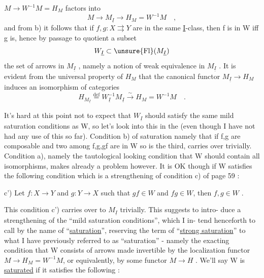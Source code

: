
$M\longrightarrow W^{-1}M=H_M$ factors into
\[ M\longrightarrow M_{\underline{I}}\longrightarrow H_M = W^{-1}M \quad , \]
and from b) it follows that if $f,g : X\rightrightarrows Y$ are in the same \underline{I}-class, then
f is in W iff g is, hence by passage to quotient a subset
\[ W_{\underline{I}}\subset \unsure{\mathrm{Fl}}(M_{\underline{I}}) \]
 the set of arrows in $M_{\underline{I}}$ , namely a notion of  weak equivalence in
$M_{\underline{I}}$ . It is evident from the universal property of $H_M$ that the canonical
functor $M_{\underline{I}}\to H_M$ induces an isomorphism of categories
\[ H_{M_{\underline{I}}} \overset{\mathrm{def}}{=} W_{\underline{I}}^{-1}M_{\underline{I}} \xrightarrow{\ \sim\ } H_M = W^{-1}M \quad . \]

\margin{\unsure{$\ulcorner$}}It's hard at this point not to expect that $W_{\underline{I}}$ should satisfy the same mild
saturation conditions as W, so let's look into this in the  (even
though I have not had any use of this so far). Condition b) of saturation\hand{,}
namely that if f,g are composable and two among f,g,gf are in W so is the
third, carries over trivially. Condition a), namely the tautological
looking condition that W should contain all isomorphisms, makes already
a problem however. It is OK though if W satisfies the following  condition\hand{,}
which is a strengthening of condition c) of page 59 :

c') Let $f\colon X\longrightarrow Y$ and $g\colon Y\longrightarrow X$ such that $gf\in W$ and $fg\in W$, then
$f,g\in W$ .

This condition c') carries over to $M_{\underline{I}}$ trivially. This suggests to intro-%
duce a strengthening of the ``mild saturation conditions'', which  I in-%
tend henceforth to call by the name of ``\uline{saturation}'', reserving the term
of ``\uline{strong saturation}'' to what I have previously referred to 
as ``saturation'' - namely the  exacting condition that W consists of \uline{}
arrows made invertible by the localization functor $M\longrightarrow H_M=W^{-1}M$, or
equivalently, by some functor $M\to H$ .  We'll say W is \uline{saturated} if it
satisfies the following :

